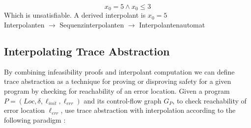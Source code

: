 \documentclass{article}
\newcommand\mycom[1]{}
\newcommand\mycom[1]{#1}
\newcommand{\jw}[1]{\mycom{\todo[color=blue!40,inline]{\small JW: #1}}}
\begin{document}
\jw{TODO}

\begin{equation}
    x_0 = 5 \land x_0 \leq 3
\end{equation}
Which is unsatisfiable. A derived interpolant is $x_0 = 5$ \\
Interpolanten $\rightarrow$ Sequenzinterpolanten \cite{10.1007/11691372_33} $\rightarrow$ Interpolantenautomat

\vspace*{2cm}

\subsection{Interpolating Trace Abstraction}

By combining infeasibility proofs and interpolant computation we can define trace abstraction as a technique for proving or disproving safety for a given program by checking for reachability of an error location.
Given a program $P = (Loc, \delta, \ell_{init}, \ell_{err})$ and its control-flow graph $G_P$, to check reachability of error location $\ell_{err}$, use trace abstraction with interpolation according to the following paradigm \cite{10.1007/978-3-642-03237-0_7}: \\
\end{document}

